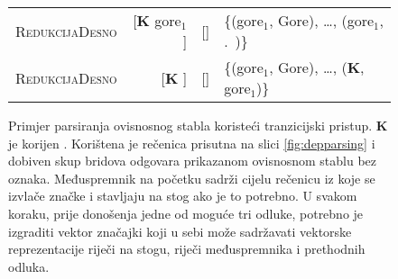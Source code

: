\begin{figure}
\begin{tabular}{l|rlm{4cm}}
  \textsc{RedukcijaDesno}   & {[}\textbf{K} gore$_1$ {]}                          & {[}{]}                                                                      & \{(gore$_1$, Gore), \ldots, (gore$_1$, .~)\}  \\
  \textsc{RedukcijaDesno}   & {[}\textbf{K} {]}                                   & {[}{]}                                                                      & \{(gore$_1$, Gore), \ldots, (\textbf{K}, gore$_1$)\}  \\
  \end{tabular}
  \caption[Primjer parsiranja ovisnosnog stabla koristeći tranzicijski
  pristup.]{Primjer parsiranja ovisnosnog stabla koristeći tranzicijski pristup.
  \textbf{K} je korijen . Korištena je rečenica prisutna na slici
  \ref{fig:depparsing} i dobiven skup bridova odgovara prikazanom ovisnosnom
  stablu bez oznaka. Međuspremnik na početku sadrži cijelu rečenicu iz koje se
  izvlače značke i stavljaju na stog ako je to potrebno. U svakom koraku, prije
  donošenja jedne od moguće tri odluke, potrebno je izgraditi vektor značajki
  koji u sebi može sadržavati vektorske reprezentacije riječi na stogu, riječi
  međuspremnika i prethodnih odluka.}
  \label{fig:shiftreduce}
\end{figure}
